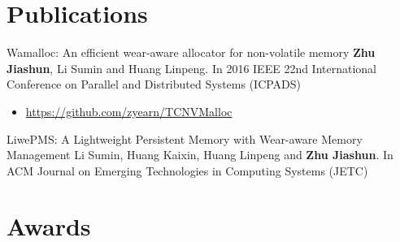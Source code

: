 \documentclass[11pt,a4paper]{moderncv}
\begin{document}



\section{Publications}

{Wamalloc: An efficient wear-aware allocator for non-volatile memory}
{\textbf{Zhu Jiashun}, Li Sumin and Huang Linpeng. In 2016 IEEE 22nd International Conference on Parallel and Distributed Systems (ICPADS)}
{}
{}
{
\begin{itemize}
    \item \url{https://github.com/zyearn/TCNVMalloc}
\end{itemize}
}
{LiwePMS: A Lightweight Persistent Memory with Wear-aware Memory Management}
{Li Sumin, Huang Kaixin, Huang Linpeng and \textbf{Zhu Jiashun}. In ACM Journal on Emerging Technologies in Computing Systems (JETC)}
{}
{}
{}


\section{Awards}

\end{document}
